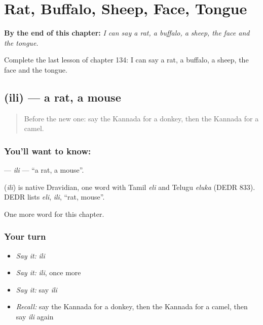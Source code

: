 
\chapter{Rat, Buffalo, Sheep, Face, Tongue}
\label{ch:ka-rat-buffalo-sheep-face-tongue}

\begin{chapteropening}
\textbf{By the end of this chapter:} \emph{I can say a rat, a buffalo, a sheep, the face and the tongue.}

Complete the last lesson of chapter 134: I can say a rat, a buffalo, a sheep, the face and the tongue.
\end{chapteropening}

\section[\texorpdfstring{\kn{ಇಲಿ} (ili)}{ಇಲಿ (ili)}]{ (ili) — a rat, a mouse}

\label{lesson:KA-C134-ili}



\begin{quote}
Before the new one: say the Kannada for a donkey, then the Kannada for a camel.
\end{quote}

\subsection*{You'll want to know: }
\textbf{} — \emph{ili} — \textquotedblleft{}a rat, a mouse\textquotedblright{}.

\begin{cousinweb}
\textbf{} (\emph{ili}) is native Dravidian, one word with Tamil \emph{eli} and Telugu \emph{eluka} (DEDR 833). DEDR lists \emph{eli}, \emph{ili}, \textquotedblleft{}rat, mouse\textquotedblright{}.
\end{cousinweb}

\begin{grammarlens}[title={What you've built}]
One more word for this chapter.
\end{grammarlens}

\subsection*{Your turn}
\begin{itemize}
\raggedright
  \item \emph{Say it:} \emph{ili}
  \item \emph{Say it:} \emph{ili}, once more
  \item \emph{Say it:} say \emph{ili}
  \item \emph{Recall:} say the Kannada for a donkey, then the Kannada for a camel, then say \emph{ili} again
\end{itemize}

